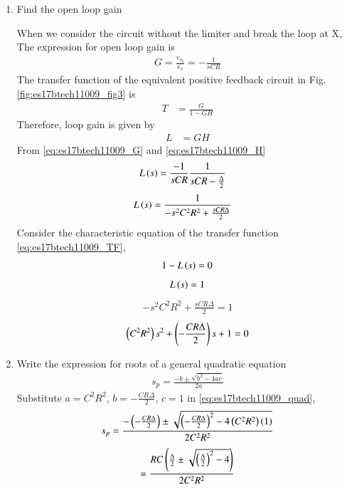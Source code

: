\begin{enumerate}[label=\thesubsection.\arabic*.,ref=\thesubsection.\theenumi]
\item
Find the open loop gain

When we consider the circuit without the limiter and break the loop at X,
The expression for open loop gain is 
\begin{align}
    G = \frac{v_{o_2}}{v_x} = -\frac{1}{sCR}
    \label{eq:es17btech11009_G}
\end{align}
The transfer function of the equivalent positive feedback circuit in Fig. \ref{fig:es17btech11009_fig3} is  
\begin{align}
T &= \frac{G}{1-GH}
\label{eq:es17btech11009_TF}
\end{align}
Therefore, loop gain is given by 
\begin{align}
L &= GH
\end{align}
From \eqref{eq:es17btech11009_G} and \eqref{eq:es17btech11009_H}
\begin{align}
L\left(s\right)&= \frac{-1}{sCR}\frac{1}{sCR - \frac{\Delta}{2}}
\end{align}
\begin{align}
L\left(s\right)&= \frac{1}{-s^2C^2R^2 + \frac{sCR\Delta}{2}}
\end{align}
Consider the characteristic equation of the transfer function \eqref{eq:es17btech11009_TF},
\begin{align}
    1 - L\left(s\right) = 0
\end{align}
\begin{align}
    L\left(s\right) = 1
\end{align}
\begin{align}
    -s^2C^2R^2 + \frac{sCR\Delta}{2} = 1
\end{align}
\begin{align}
    \left(C^2R^2\right)s^2 + \left(-\frac{CR\Delta}{2}\right)s + 1 = 0
\end{align}
\item
Write the expression for roots of a general quadratic equation
\begin{align}
    s_{p} = \frac{-b \pm \sqrt{b^2 - 4ac}}{2a}
    \label{eq:es17btech11009_quad}
\end{align}
 Substitute $a=C^2R^2$, $b=-\frac{CR\Delta}{2}$, $c=1$ in \eqref{eq:es17btech11009_quad},
 \begin{align}
     s_{p} = \frac{-\left(-\frac{CR\Delta}{2}\right) \pm \sqrt{\left(-\frac{CR\Delta}{2}\right)^2 - 4\left(C^2R^2\right)\left(1\right)}}{2C^2R^2}
 \end{align}
 \begin{align}
      = \frac{RC\brak{\frac{\Delta}{2} \pm \sqrt{\brak{\frac{\Delta}{2}}^2 -4}}}{2C^2R^2}

\end{align}
\end{enumerate}
